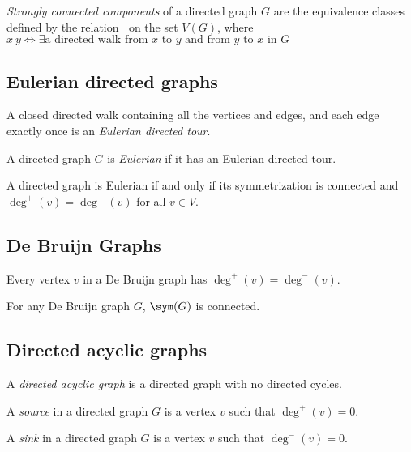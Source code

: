 \documentclass{classnotes}
\begin{document}
\begin{definition}
    \emph{Strongly connected components} of a directed graph $G$ are the equivalence classes defined by the relation $~$ on the set $V(G)$, where $x~y \iff \exists \text{a directed walk from $x$ to $y$ and from $y$ to $x$ in $G$} $
\end{definition}

\subsection{Eulerian directed graphs}
\begin{definition}
    A closed directed walk containing all the vertices and edges, and each edge exactly once is an \emph{Eulerian directed tour}.
\end{definition}

\begin{definition}
    A directed graph $G$ is \emph{Eulerian} if it has an Eulerian directed tour.
\end{definition}

\begin{theorem}
    A directed graph is Eulerian if and only if its symmetrization is connected and $\deg^+(v) = \deg^-(v)$ for all $v \in V$.
\end{theorem}

\subsection{De Bruijn Graphs}
\begin{lemma}
    Every vertex $v$ in a De Bruijn graph has $\deg^+(v)=\deg^-(v)$.
\end{lemma}
\begin{lemma}
    For any De Bruijn graph $G$, $\sym(G)$ is connected.
\end{lemma}

\subsection{Directed acyclic graphs}
\begin{definition}
    A \emph{directed acyclic graph} is a directed graph with no directed cycles.
\end{definition}

\begin{definition}[Source]
    A \emph{source} in a directed graph $G$ is a vertex $v$ such that $\deg^+(v) = 0$.
\end{definition}
\begin{definition}[Sink]
    A \emph{sink} in a directed graph $G$ is a vertex $v$ such that $\deg^-(v) = 0$.
\end{definition}
\end{document}
